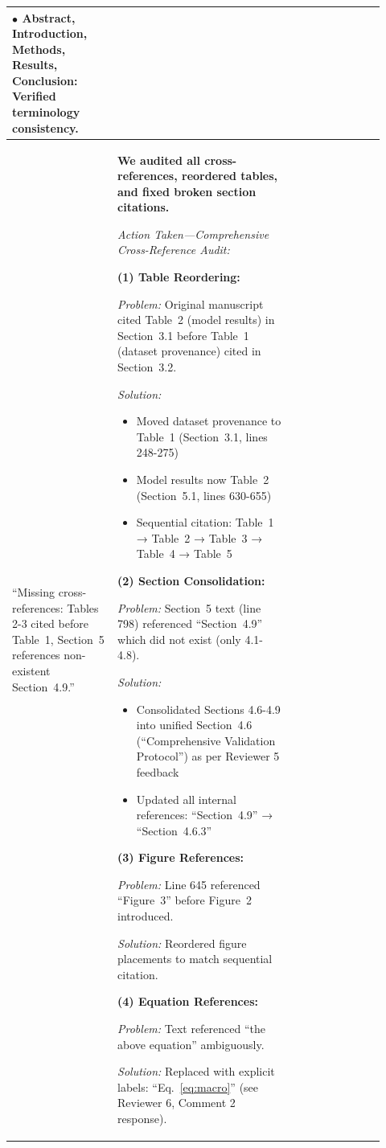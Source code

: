 \documentclass[11pt,a4paper]{article}
\begin{document}
\begin{longtable}{>{\raggedright\arraybackslash}p{0.26\linewidth}|>{\raggedright\arraybackslash}p{0.44\linewidth}|>{\raggedright\arraybackslash}p{0.22\linewidth}}
$\bullet$ \textbf{Abstract, Introduction, Methods, Results, Conclusion}: Verified terminology consistency. \\

\midrule

``Missing cross-references: Tables 2-3 cited before Table~1, Section~5 references non-existent Section~4.9.'' &

\textbf{We audited all cross-references, reordered tables, and fixed broken section citations.}

\textit{Action Taken---Comprehensive Cross-Reference Audit:}

\textbf{(1) Table Reordering:}

\textit{Problem:} Original manuscript cited Table~2 (model results) in Section~3.1 before Table~1 (dataset provenance) cited in Section~3.2.

\textit{Solution:}
\begin{itemize}
    \item Moved dataset provenance to Table~1 (Section~3.1, lines 248-275)
    \item Model results now Table~2 (Section~5.1, lines 630-655)
    \item Sequential citation: Table~1 → Table~2 → Table~3 → Table~4 → Table~5
\end{itemize}

\textbf{(2) Section Consolidation:}

\textit{Problem:} Section~5 text (line 798) referenced ``Section~4.9'' which did not exist (only 4.1-4.8).

\textit{Solution:}
\begin{itemize}
    \item Consolidated Sections 4.6-4.9 into unified Section~4.6 (``Comprehensive Validation Protocol'') as per Reviewer 5 feedback
    \item Updated all internal references: ``Section~4.9'' → ``Section~4.6.3''
\end{itemize}

\textbf{(3) Figure References:}

\textit{Problem:} Line 645 referenced ``Figure~3'' before Figure~2 introduced.

\textit{Solution:} Reordered figure placements to match sequential citation.

\textbf{(4) Equation References:}

\textit{Problem:} Text referenced ``the above equation'' ambiguously.

\textit{Solution:} Replaced with explicit labels: ``Eq.~\eqref{eq:macro}'' (see Reviewer 6, Comment 2 response).


\end{longtable}
\end{document}
